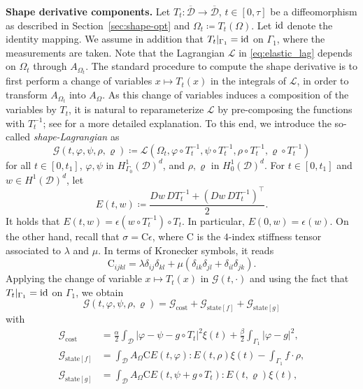 \documentclass[preprint,9pt]{elsarticle}
\begin{document}
\textbf{Shape derivative components.}
Let $T_t\colon\overline{\mathcal{D}}\to\overline{\mathcal{D}}$,
$t\in [0,\tau]$ be a diffeomorphism as described in
Section~\ref{sec:shape-opt} and $\Omega_t \coloneqq T_t(\Omega)$.
Let $\rm{id}$ denote the identity mapping.
We assume in addition that ${T_t}|_{\Gamma_1}=\rm{id}$ on $\Gamma_1$,
where the measurements are taken.
Note that the Lagrangian $\mathcal{L}$ in \eqref{eq:elastic_lag}
depends on $\Omega_t$  through $A_{\Omega_t}$.
The standard procedure to compute the shape derivative is to
first perform a change of variables $x\mapsto T_t(x)$ in
the integrals of $\mathcal{L}$, in order to transform
$A_{\Omega_t}$ into $A_{\Omega}$.
As this change of variables induces a composition
of the variables by $T_t$, it is natural to reparameterize $\mathcal{L}$
by pre-composing the functions with $T_t^{-1}$; see \cite{MR4531392}
for a more detailed explanation. 
To this end, we introduce the so-called {\it shape-Lagrangian} as
\[
	\mathcal{G}(t,\varphi,\psi,\rho,\varrho)
	\coloneqq \mathcal{L}\left(
		\Omega_{t},\varphi\circ T_{t}^{-1},\psi\circ T_{t}^{-1},
		\rho\circ T_{t}^{-1},\varrho\circ T_{t}^{-1}
	\right)
\]
for all $t\in[0, t_1]$, $\varphi,\psi$ in $H^1_{\Gamma_0}(\mathcal{D})^d$,
and $\rho,\varrho$ in $H^1_0(\mathcal{D})^d$.
For $t\in[0, t_1]$ and $w \in H^1(\mathcal{D})^d$, let
\[
	E(t,w)\coloneqq\frac{Dw\,DT_{t}^{-1}+(Dw\,DT_{t}^{-1})^{\top}}{2}.
\]
It holds that $E(t,w) = \epsilon\left(w\circ T_{t}^{-1}\right)\circ T_{t}$.
In particular, $E(0, w) = \epsilon(w)$.
On the other hand, recall that $\sigma = \mathrm{C}\epsilon$,
where $\mathrm{C}$ is the $4$-index stiffness tensor associated to
$\lambda$ and $\mu$. In terms of Kronecker symbols, it reads
\[
	\mathrm{C}_{ijkl} =
	\lambda \delta_{ij} \delta_{kl} +
	\mu(\delta_{ik}\delta_{jl} + \delta_{il}\delta_{jk}).
\]
Applying the change of variable $x \mapsto T_t(x)$ in $\mathcal{G}(t,\cdot)$
and using the fact that $T_t|_{\Gamma_1}=\rm{id}$ on $\Gamma_1$, we obtain
\begin{equation}
	\mathcal{G}(t,\varphi,\psi,\rho,\varrho) =
	\mathcal{G}_{\mathrm{cost}} +
	\mathcal{G}_{\mathrm{state}[f]} +
	\mathcal{G}_{\mathrm{state}[g]}
\end{equation}
with
\[
\begin{aligned}
	\mathcal{G}_{\mathrm{cost}} &
	= \frac{\alpha}{2}\int_{\mathcal{D}}|\varphi-\psi-g\circ T_{t}|^{2}\xi(t)
	+\frac{\beta}{2}\int_{\Gamma_{1}}|\varphi-g|^{2}, \\
	\mathcal{G}_{\mathrm{state}[f]} &
	= \int_{\mathcal{D}}A_{\Omega}
		\mathrm{C}E(t,\varphi)\colon\!E(t,\rho)\xi(t)
	-\int_{\Gamma_{1}}f\cdot\rho, \\
	\mathcal{G}_{\mathrm{state}[g]} &
	= \int_{\mathcal{D}}A_{\Omega}
		\mathrm{C}E(t,\psi + g\circ T_{t})\colon\!E(t,\varrho)\xi(t),
\end{aligned}
\]
\end{document}
